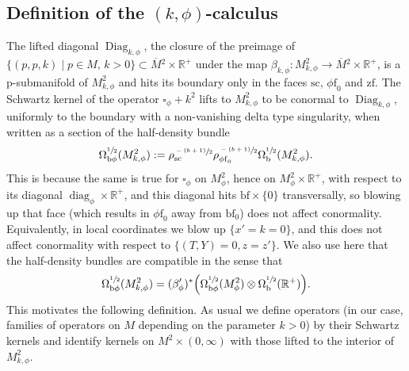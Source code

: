 \documentclass[JEP,XML,SOM,Unicode,NoFloatCountersInSection,published]{cedram}
\newcommand{\bphi}{{\bb\phi}}
\theoremstyle{plain}
\theoremstyle{definition}
\newcommand{\R}{{\mathbb{R}}}
\newcommand{\phif}{{\phi\mathrm{f}}}
\newcommand{\bb}{{\mathrm{b}}}
\newcommand{\bbf}{{\mathrm{bf}}}
\newcommand{\ssc}{{\mathrm{sc}}}
\newcommand{\zf}{{\mathrm{zf}}}
\DeclareMathOperator{\Diag}{Diag}
\DeclareMathOperator\diag{diag}
\newcommand{\Mbar}{{\overline{M}}}\let\M\Mbar
\begin{document}
\subsection{Definition of the $(k,\phi)$-calculus}\label{subsec:def psi k phi}
The lifted diagonal $\Diag_{k,\phi}$, \ie the closure of the preimage
of $\{(p,p,k)\mid p\in M,\, k>0\}\subset \Mbar{}^2\times\R^+$ under the map
$\beta_{k,\phi}:M^2_{k,\phi}\to \Mbar{}^2\times\R^+$,
is a p-submanifold of $M^2_{k,\phi}$ and hits its boundary only in the faces $\ssc$, $\phif_0$ and $\zf$.
The Schwartz kernel of the operator $\square_\phi+k^2$ lifts to $M^2_{k,\phi}$ to be conormal to
$\Diag_{k,\phi}$, uniformly to the boundary with a non-vanishing delta type singularity, when written as a section of the half-density bundle
\begin{equation}
\Omega^{\sfrac{1}{2}}_{\bphi}(M^{2}_{k, \phi}) := \rho_{\ssc}^{\sfrac{-(b+1)}{2}}
\rho_{\phif_0}^{\sfrac{-(b+1)}{2}} \Omega^{\sfrac12}_\bb(M^{2}_{k, \phi}).
\end{equation}
This is because the same is true for $\square_\phi$ on $M^2_\phi$, hence on $M^2_\phi\times\R^+$,
with respect to its diagonal $\diag_\phi\times\R^+$, and this diagonal hits $\bbf\times\{0\}$ transversally,
so blowing up that face (which results in $\phif_0$ away from $\bbf_0$) does not affect conormality.
Equivalently, in local coordinates we blow up $\{x'=k=0\}$, and this does not affect conormality with
respect to $\{(T,Y)=0,z=z'\}$. We also use here that the half-density bundles are compatible in the
sense that
\[
\Omega^{\sfrac12}_{\bphi}(M^2_{k,\phi}) =(\beta_\phi')^*\Bigl(\Omega^{\sfrac12}_{\bphi}(M^2_\phi)
\otimes\Omega^{\sfrac12}_\bb(\R^+)\Bigr).
\]
This motivates the following definition. As usual we define operators
(in our case, families of operators on $M$ depending on the parameter $k>0$)
by their Schwartz kernels and identify kernels on ${M}^2\times(0,\infty)$ with
those lifted to the interior of $M^2_{k,\phi}$.
\end{document}
